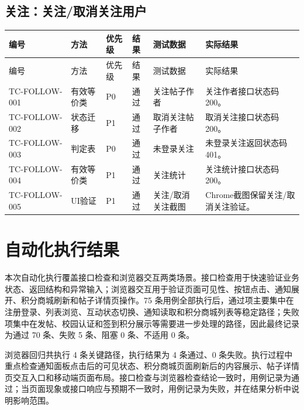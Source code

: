 \documentclass[bwprint]{report}
\begin{document}
\subsection{关注：关注/取消关注用户}
{\footnotesize
\setlength{\tabcolsep}{3pt}
\begin{longtable}{P{2.0cm}P{2.0cm}P{0.9cm}P{0.9cm}P{3.4cm}P{5.4cm}}
\toprule
编号 & 方法 & 优先级 & 结果 & 测试数据 & 实际结果\\
\midrule
\endfirsthead
\toprule
编号 & 方法 & 优先级 & 结果 & 测试数据 & 实际结果\\
\midrule
\endhead
TC-FOLLOW-001 & 有效等价类 & P0 & 通过 & 关注帖子作者 & 关注作者接口状态码200。 \\
TC-FOLLOW-002 & 状态迁移 & P1 & 通过 & 取消关注帖子作者 & 取消关注接口状态码200。 \\
TC-FOLLOW-003 & 判定表 & P0 & 通过 & 未登录关注 & 未登录关注返回状态码401。 \\
TC-FOLLOW-004 & 有效等价类 & P1 & 通过 & 关注统计 & 关注统计接口状态码200。 \\
TC-FOLLOW-005 & UI验证 & P1 & 通过 & 关注/取消关注截图 & Chrome截图保留关注/取消关注验证。 \\
\bottomrule
\end{longtable}
}

\section{自动化执行结果}
本次自动化执行覆盖接口检查和浏览器交互两类场景。接口检查用于快速验证业务状态、返回结构和异常输入；浏览器交互用于验证页面可见性、按钮点击、通知展开、积分商城刷新和帖子详情页操作。75 条用例全部执行后，通过项主要集中在注册登录、列表浏览、互动状态切换、通知读取和积分商城列表等稳定路径；失败项集中在发帖、校园认证和签到积分展示等需要进一步处理的路径，因此最终记录为通过 70 条、失败 5 条、阻塞 0 条、不适用 0 条。

浏览器回归共执行 4 条关键路径，执行结果为 4 条通过、0 条失败。执行过程中重点检查通知面板点击后的可见状态、积分商城页面刷新后的内容展示、帖子详情页交互入口和移动端页面布局。接口检查与浏览器检查结论一致时，用例记录为通过；当页面现象或接口响应与预期不一致时，用例记录为失败，并在结果分析中说明影响范围。
\end{document}
